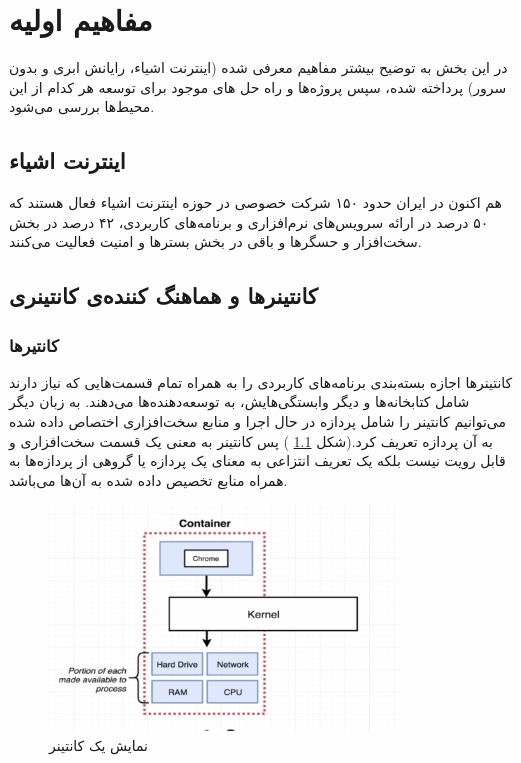 \chapter{مفاهیم اولیه‌}\label{chapter2}

در این بخش به توضیح بیشتر مفاهیم معرفی شده (اینترنت اشیاء، رایانش ابری و بدون سرور) پرداخته شده، سپس پروژه‌ها و راه حل های موجود برای توسعه هر کدام از این محیط‌ها بررسی می‌شود.

\section{اینترنت اشیاء}

 هم اکنون در ایران حدود ۱۵۰ شرکت خصوصی در حوزه اینترنت اشیاء فعال هستند که ۵۰ درصد در ارائه سرویس‌های نرم‌افزاری و برنامه‌های کاربردی، ۴۲ درصد در بخش سخت‌افزار و حسگرها و باقی در بخش بسترها و امنیت فعالیت می‌کنند.

\section{کانتینرها و هماهنگ کننده‌ی کانتینری}

\subsection{کانتیرها}

کانتینرها اجازه بسته‌بندی برنامه‌های کاربردی را به همراه تمام قسمت‌هایی که نیاز دارند شامل کتابخانه‌ها و دیگر وابستگی‌هایش، به توسعه‌دهنده‌ها می‌دهند. به زبان دیگر می‌توانیم کانتینر را شامل پردازه در حال اجرا و منابع سخت‌افزاری اختصاص داده شده به آن پردازه تعریف کرد.(شکل
\ref{تصویر 2-1}
) پس کانتینر به معنی یک قسمت سخت‌افزاری و قابل رویت نیست بلکه یک تعریف انتزاعی به معنای یک پردازه یا گروهی از پردازه‌ها به همراه منابع تخصیص داده شده به آن‌ها می‌باشد. 

\begin{figure}[!h]
	\centering
	\includegraphics[height=6cm]{fig2-1}
	\caption{نمایش یک کانتینر}
	\label{تصویر 2-1}
\end{figure}

